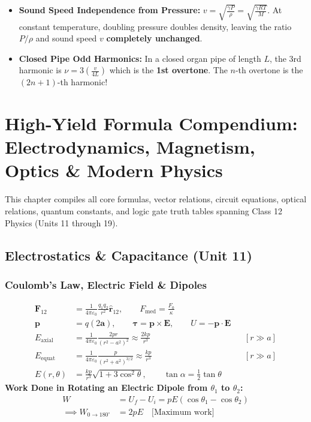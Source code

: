 \documentclass[10pt,twoside,openright]{book}
\begin{document}
\begin{trapbox}
\begin{itemize}
  \item \textbf{Sound Speed Independence from Pressure:} $v = \sqrt{\frac{\gamma P}{\rho}} = \sqrt{\frac{\gamma R T}{M}}$. At constant temperature, doubling pressure doubles density, leaving the ratio $P/\rho$ and sound speed $v$ \textbf{completely unchanged}.
  \item \textbf{Closed Pipe Odd Harmonics:} In a closed organ pipe of length $L$, the 3rd harmonic is $\nu = 3\left(\frac{v}{4L}\right)$ which is the \textbf{1st overtone}. The $n$-th overtone is the $(2n+1)$-th harmonic!
\end{itemize}
\end{trapbox}

\chapter{High-Yield Formula Compendium: Electrodynamics, Magnetism, Optics \& Modern Physics}

This chapter compiles all core formulas, vector relations, circuit equations, optical relations, quantum constants, and logic gate truth tables spanning Class 12 Physics (Units 11 through 19).

\section{Electrostatics \& Capacitance (Unit 11)}

\subsection{Coulomb's Law, Electric Field \& Dipoles}

\begin{formulabox}
\begin{align}
  \mathbf{F}_{12} &= \frac{1}{4\pi\varepsilon_0}\frac{q_1 q_2}{r^2}\hat{\mathbf{r}}_{12}, \qquad F_{\text{med}} = \frac{F_0}{\kappa} \\
  \mathbf{p} &= q(2\mathbf{a}), \qquad \boldsymbol{\tau} = \mathbf{p}\times\mathbf{E}, \qquad U = -\mathbf{p}\cdot\mathbf{E} \\
  E_{\text{axial}} &= \frac{1}{4\pi\varepsilon_0}\frac{2pr}{(r^2-a^2)^2} \approx \frac{2kp}{r^3} && [r \gg a] \\
  E_{\text{equat}} &= \frac{1}{4\pi\varepsilon_0}\frac{p}{(r^2+a^2)^{3/2}} \approx \frac{kp}{r^3} && [r \gg a] \\
  E(r,\theta) &= \frac{kp}{r^3}\sqrt{1 + 3\cos^2\theta}, \qquad \tan\alpha = \frac{1}{2}\tan\theta
\end{align}
\textbf{Work Done in Rotating an Electric Dipole from $\theta_1$ to $\theta_2$:}
\begin{align}
  W &= U_f - U_i = pE(\cos\theta_1 - \cos\theta_2) \\
  \implies W_{0 \to 180^\circ} &= 2pE \quad \text{[Maximum work]}
\end{align}
\end{formulabox}
\end{document}
